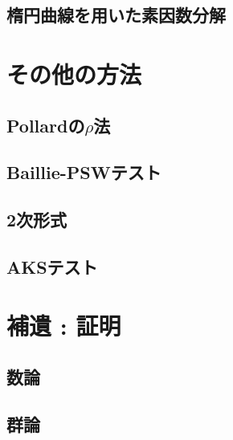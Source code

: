 \subsection{楕円曲線を用いた素因数分解}


\section{その他の方法}
\subsection{Pollardの$\rho$法}

\subsection{Baillie-PSWテスト}

\subsection{2次形式}

\subsection{AKSテスト}


\section{補遺 : 証明}
\subsection{数論}

\subsection{群論}


\newpage
\printindex



